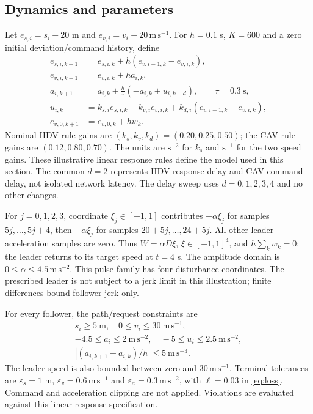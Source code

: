 \documentclass[11pt]{article}
\begin{document}
\subsection*{Dynamics and parameters}
Let $e_{s,i}=s_i-20$ m and $e_{v,i}=v_i-20\,\mathrm{m\,s^{-1}}$. For $h=0.1$ s, $K=600$ and a zero initial deviation/command history, define
\begin{align}
e_{s,i,k+1}&=e_{s,i,k}+h(e_{v,i-1,k}-e_{v,i,k}),\\
e_{v,i,k+1}&=e_{v,i,k}+ha_{i,k},\\
a_{i,k+1}&=a_{i,k}+\frac{h}{\tau}(-a_{i,k}+u_{i,k-d}),\qquad \tau=0.3\ \mathrm{s},\\
u_{i,k}&=k_{s,i}e_{s,i,k}-k_{v,i}e_{v,i,k}+k_{d,i}(e_{v,i-1,k}-e_{v,i,k}),\label{eq:demopolicy}\\
e_{v,0,k+1}&=e_{v,0,k}+hw_k.
\end{align}
Nominal HDV-rule gains are $(k_s,k_v,k_d)=(0.20,0.25,0.50)$; the CAV-rule gains are $(0.12,0.80,0.70)$. The units are $\mathrm{s^{-2}}$ for $k_s$ and $\mathrm{s^{-1}}$ for the two speed gains. These illustrative linear response rules define the model used in this section. The common $d=2$ represents HDV response delay and CAV command delay, not isolated network latency. The delay sweep uses $d=0,1,2,3,4$ and no other changes.

For $j=0,1,2,3$, coordinate $\xi_j\in[-1,1]$ contributes $+\alpha\xi_j$ for samples $5j,\ldots,5j+4$, then $-\alpha\xi_j$ for samples $20+5j,\ldots,24+5j$. All other leader-acceleration samples are zero. Thus $W=\alpha D\xi$, $\xi\in[-1,1]^4$, and $h\sum_kw_k=0$; the leader returns to its target speed at $t=4$ s. The amplitude domain is $0\leq\alpha\leq4.5\,\mathrm{m\,s^{-2}}$. This pulse family has four disturbance coordinates. The prescribed leader is not subject to a jerk limit in this illustration; finite differences bound follower jerk only.

For every follower, the path/request constraints are
\begin{gather}
s_i\geq5\ \mathrm{m},\quad 0\leq v_i\leq30\ \mathrm{m\,s^{-1}},\\
-4.5\leq a_i\leq2\ \mathrm{m\,s^{-2}},\quad -5\leq u_i\leq2.5\ \mathrm{m\,s^{-2}},\\
\left|(a_{i,k+1}-a_{i,k})/h\right|\leq5\ \mathrm{m\,s^{-3}}.
\end{gather}
The leader speed is also bounded between zero and $30\,\mathrm{m\,s^{-1}}$. Terminal tolerances are $\varepsilon_s=1$ m, $\varepsilon_v=0.6\,\mathrm{m\,s^{-1}}$ and $\varepsilon_a=0.3\,\mathrm{m\,s^{-2}}$, with $\ell=0.03$ in \eqref{eq:loss}. Command and acceleration clipping are not applied. Violations are evaluated against this linear-response specification.
\end{document}
